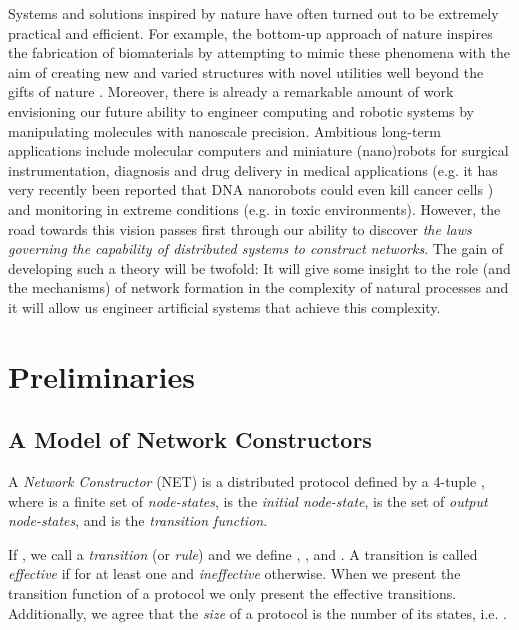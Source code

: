 \documentclass[oribibl, 11pt]{llncs}
\begin{document}
Systems and solutions inspired by nature have often turned out to be extremely practical and efficient. For example, the bottom-up approach of nature inspires the fabrication of biomaterials by attempting to mimic these phenomena with the aim of creating new and varied structures with novel utilities well beyond the gifts of nature \cite{Zh03}. Moreover, there is already a remarkable amount of work envisioning our future ability to engineer computing and robotic systems by manipulating molecules with nanoscale precision. Ambitious long-term applications include molecular computers \cite{BPSPF10} and miniature (nano)robots for surgical instrumentation, diagnosis and drug delivery in medical applications (e.g. it has very recently been reported that DNA nanorobots could even kill cancer cells \cite{DBC12}) and monitoring in extreme conditions (e.g. in toxic environments). However, the road towards this vision passes first through our ability to discover \emph{the laws governing the capability of distributed systems to construct networks}. The gain of developing such a theory will be twofold: It will give some insight to the role (and the mechanisms) of network formation in the complexity of natural processes and it will allow us engineer artificial systems that achieve this complexity.

\section{Preliminaries}
\label{sec:prel}

\subsection{A Model of Network Constructors}
\label{sec:model}

\begin{definition}
A \emph{Network Constructor} (NET) is a distributed protocol defined by a 4-tuple , where
 is a finite set of \emph{node-states},  is the \emph{initial node-state},  is the set of \emph{output node-states}, and  is the \emph{transition function}.
\end{definition}

If , we call  a \emph{transition} (or \emph{rule}) and we define , , and . A transition  is called \emph{effective} if  for at least one  and \emph{ineffective} otherwise. When we present the transition function of a protocol we only present the effective transitions. Additionally, we agree that the \emph{size} of a protocol is the number of its states, i.e. .
\end{document}
